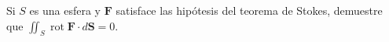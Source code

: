 \item Si $S$ es una esfera y $\mathbf{F}$ satisface las hipótesis del teorema de Stokes, demuestre que $\iint_S \operatorname{rot} \mathbf{F} \cdot d\mathbf{S} = 0$.
